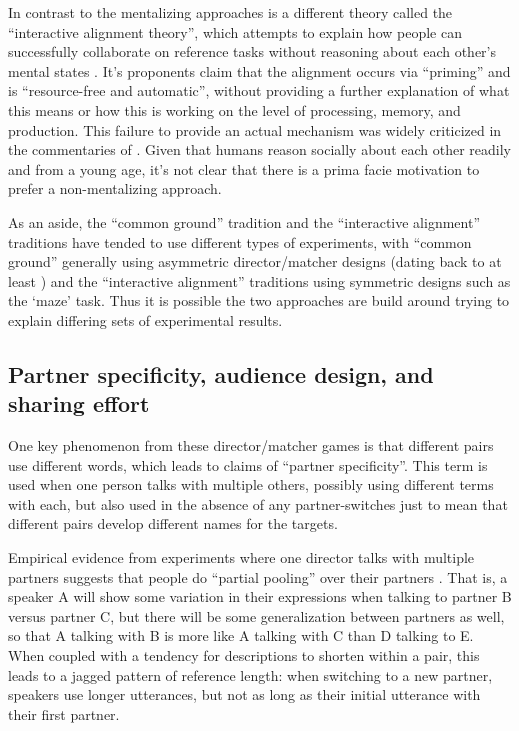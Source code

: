\documentclass[]{article}
\begin{document}
In contrast to the mentalizing approaches is a different theory called the ``interactive alignment theory'', which attempts to explain how people can successfully collaborate on reference tasks without reasoning about each other's mental states \cite{pickering2004, gandolfi2022}. It's proponents claim that the alignment occurs via ``priming'' and is ``resource-free and automatic'', without providing a further explanation of what this means or how this is working on the level of processing, memory, and production\cite{pickering2004}. This failure to provide an actual mechanism was widely criticized in the commentaries of \cite{pickering2004}. Given that humans reason socially about each other readily and from a young age, it's not clear that there is a prima facie motivation to prefer a non-mentalizing approach. 

As an aside, the ``common ground'' tradition and the ``interactive alignment'' traditions have tended to use different types of experiments, with ``common ground'' generally using asymmetric director/matcher designs (dating back to at least \cite{krauss1966}) and the ``interactive alignment'' traditions using symmetric designs such as the `maze' task. Thus it is possible the two approaches are build around trying to explain differing sets of experimental results. 

\subsection{Partner specificity, audience design, and sharing effort}

One key phenomenon from these director/matcher games is that different pairs use different words, which leads to claims of ``partner specificity''. This term is used when one person talks with multiple others, possibly using different terms with each, but also used in the absence of any partner-switches just to mean that different pairs develop different names for the targets. 

Empirical evidence from experiments where one director talks with multiple partners suggests that people do ``partial pooling'' over their partners \cite{hawkins2021, yoon2014}. That is, a speaker A will show some variation in their expressions when talking to partner B versus partner C, but there will be some generalization between partners as well, so that A talking with B is more like A talking with C than D talking to E. When coupled with a tendency for descriptions to shorten within a pair, this leads to a jagged pattern of reference length: when switching to a new partner, speakers use longer utterances, but not as long as their initial utterance with their first partner.  
\end{document}
